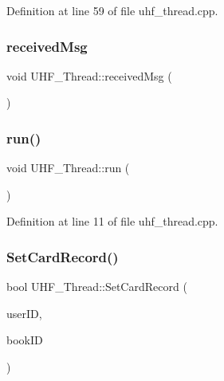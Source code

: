 Definition at line 59 of file uhf\+\_\+thread.\+cpp.

\mbox{\label{class_u_h_f___thread_aa3b7dd0bbada4349d59821aab8a17927}} 
\subsubsection{\texorpdfstring{receivedMsg}{receivedMsg}}
{\footnotesize\ttfamily void U\+H\+F\+\_\+\+Thread\+::received\+Msg (\begin{DoxyParamCaption}\item[{Q\+Byte\+Array}]{ }\end{DoxyParamCaption})\hspace{0.3cm}{\ttfamily [signal]}}

\mbox{\label{class_u_h_f___thread_a7ae2a5c0bae9b20e0fbc315febefb818}} 
\subsubsection{\texorpdfstring{run()}{run()}}
{\footnotesize\ttfamily void U\+H\+F\+\_\+\+Thread\+::run (\begin{DoxyParamCaption}{ }\end{DoxyParamCaption})\hspace{0.3cm}{\ttfamily [protected]}}



Definition at line 11 of file uhf\+\_\+thread.\+cpp.

\mbox{\label{class_u_h_f___thread_a1ec4510fd4d722b34d6cd33c3820f897}} 
\subsubsection{\texorpdfstring{SetCardRecord()}{SetCardRecord()}}
{\footnotesize\ttfamily bool U\+H\+F\+\_\+\+Thread\+::\+Set\+Card\+Record (\begin{DoxyParamCaption}\item[{Q\+String}]{user\+ID,  }\item[{Q\+String}]{book\+ID }\end{DoxyParamCaption})}



